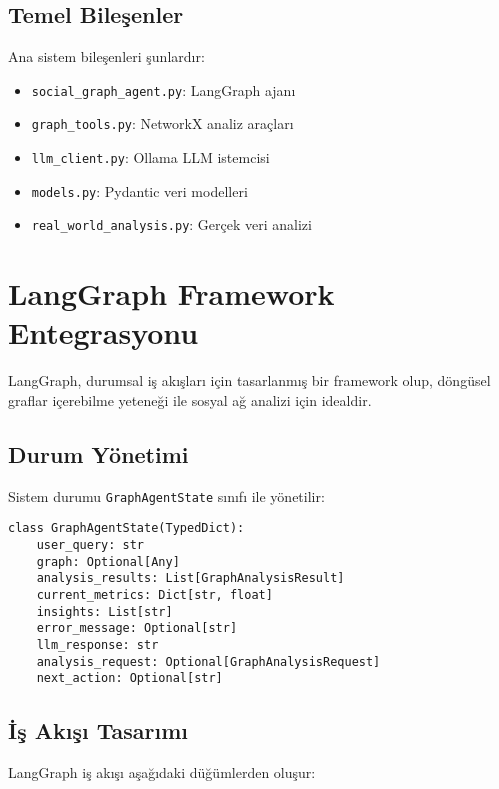 \documentclass[conference]{IEEEtran}
\begin{document}
\subsection{Temel Bileşenler}

Ana sistem bileşenleri şunlardır:

\begin{itemize}
\item \texttt{social\_graph\_agent.py}: LangGraph ajanı
\item \texttt{graph\_tools.py}: NetworkX analiz araçları
\item \texttt{llm\_client.py}: Ollama LLM istemcisi
\item \texttt{models.py}: Pydantic veri modelleri
\item \texttt{real\_world\_analysis.py}: Gerçek veri analizi
\end{itemize}

\section{LangGraph Framework Entegrasyonu}

LangGraph, durumsal iş akışları için tasarlanmış bir framework olup, döngüsel graflar içerebilme yeteneği ile sosyal ağ analizi için idealdir.

\subsection{Durum Yönetimi}

Sistem durumu \texttt{GraphAgentState} sınıfı ile yönetilir:

\begin{lstlisting}[caption=GraphAgentState Veri Yapısı]
class GraphAgentState(TypedDict):
    user_query: str
    graph: Optional[Any]
    analysis_results: List[GraphAnalysisResult]
    current_metrics: Dict[str, float]
    insights: List[str]
    error_message: Optional[str]
    llm_response: str
    analysis_request: Optional[GraphAnalysisRequest]
    next_action: Optional[str]
\end{lstlisting}

\subsection{İş Akışı Tasarımı}

LangGraph iş akışı aşağıdaki düğümlerden oluşur:
\end{document}
